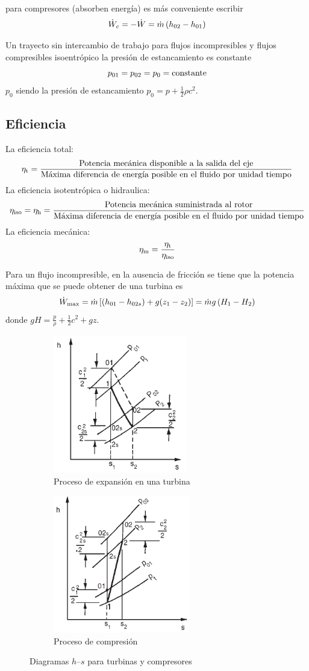 \documentclass{article}
\begin{document}
para compresores (absorben energía) es más conveniente escribir
\[
\dot{W}_c=-\dot{W} =\dot{m} \left( h_{02}-h_{01}\right)
\]

Un trayecto sin intercambio de trabajo para flujos incompresibles y flujos compresibles isoentrópico la presión de estancamiento es constante
\[
p_{01}=p_{02}=p_0=\textrm{constante}
\]
$p_0$ siendo la presión de estancamiento $p_{0}=p+\tfrac{1}{2} \rho c^{2}$.
\subsection{Eficiencia}
La eficiencia total:
\[
{\eta_{\mathrm{t}}}  = \frac{\textrm{Potencia mecánica disponible a la salida del eje}}{\textrm{Máxima diferencia de energía posible en el fluido por unidad tiempo}}
\]
La eficiencia isotentrópica o hidraulica:
\[
\eta_{\mathrm{iso}}={\eta_{\mathrm{h}}} = \frac{\textrm{Potencia mecánica suministrada al rotor}}{\textrm{Máxima diferencia de energía posible en el fluido por unidad tiempo}}
\]
La eficiencia mecánica:
\[
{\eta_{\mathrm{m}}} = \frac{{\eta_{\mathrm{t}}}}{\eta_{\mathrm{iso}}}
\]

Para un flujo incompresible, en la ausencia de fricción se tiene que la potencia máxima que se puede obtener de una turbina es
\[
\dot{W}_{\max} = \dot{m}  \left[ (h_{01}-h_{02s})+g(z_1-z_2) \right]= \dot{m} g \left(H_1-H_2 \right)
\]
donde $gH = \frac{p}{\rho}+\frac{1}{2}c^2+gz$.

\begin{figure}[htb!]
\centering
\begin{subfigure}{.49\textwidth}
\centering
\includegraphics[height=6cm]{fig/expansionturbina.png}
\caption{Proceso de expansión en una turbina}
\label{fig:expansiontrubina}
\end{subfigure}%
\begin{subfigure}{.49\textwidth}
\centering
\includegraphics[height= 6cm]{fig/procesocompresion.png}
\caption{Proceso de compresión }
\label{fig:procesocompresion}
\end{subfigure}
\caption{Diagramas $h$--$s$ para turbinas y compresores}
\label{fig:procesosturbomaquinasHS}
\end{figure}
\end{document}
